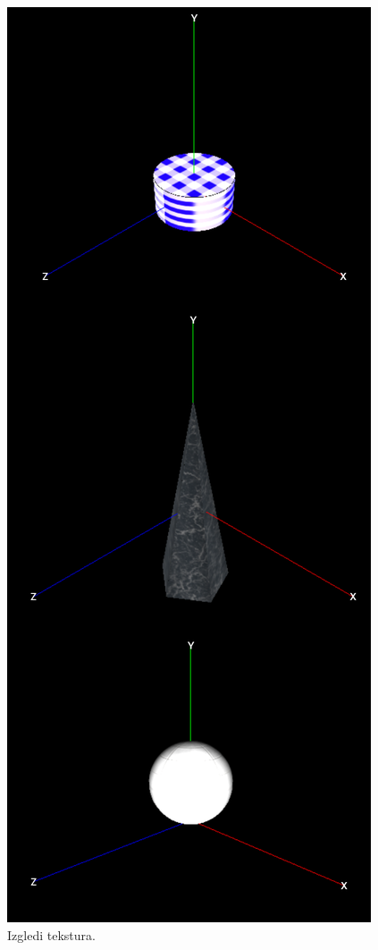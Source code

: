 \documentclass[a4paper,12pt]{article}
\begin{document}
\begin{figure}[ht]
    \centering
    \includegraphics[scale=0.45]{image/zadatak7_teksture.png}
    \caption{Izgledi tekstura.}
\end{figure}
\end{document}
